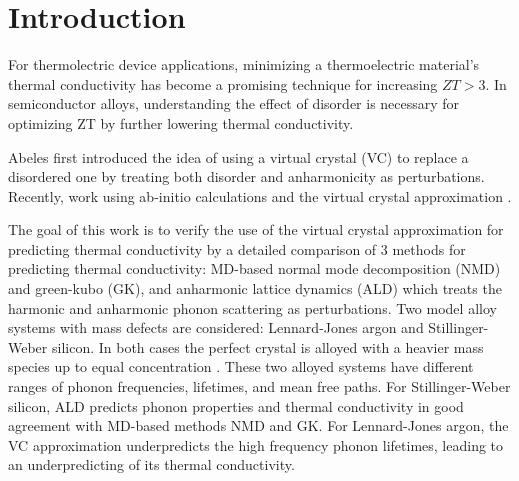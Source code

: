 \documentclass[aps,prb,twocolumn,superscriptaddress,preprintnumbers,amsmath,amssymb,floatfix]{revtex4}
\begin{document}
\maketitle
\clearpage
\section{\label{S:Intro}Introduction}

For thermolectric device applications, minimizing a thermoelectric 
material's thermal 
conductivity has become a promising technique for increasing $ZT>3$.
\cite{chen_recent_2003,dresselhaus_new_2007} In semiconductor alloys, 
understanding the effect of disorder is necessary for optimizing 
ZT by further lowering thermal conductivity.
\cite{he_thermoelectric_2006,huang_filler-reduced_2010,
toberer_phonon_2011,tian_phonon_2012}

Abeles first introduced the idea of using a virtual crystal (VC) to 
replace a disordered one by treating both
disorder and anharmonicity as perturbations.
\cite{abeles_lattice_1963} 
Recently, work using ab-initio calculations and the virtual crystal 
approximation \cite{garg_role_2011,tian_phonon_2012}.

The goal of this work is to verify the use of the virtual crystal 
approximation for predicting thermal conductivity by a detailed comparison 
of 3 methods for predicting thermal conductivity: MD-based normal mode 
decomposition (NMD) and green-kubo (GK), 
and anharmonic lattice dynamics (ALD) which treats the harmonic and 
anharmonic phonon scattering as perturbations. Two model alloy systems 
with mass defects are considered: 
Lennard-Jones argon and Stillinger-Weber silicon. 
In both cases the perfect crystal is 
alloyed with a heavier mass species up to equal concentration . These 
two alloyed systems have different ranges of phonon frequencies, 
lifetimes, and mean free paths. For Stillinger-Weber silicon, 
ALD predicts phonon properties and thermal 
conductivity in good agreement with MD-based methods NMD and GK. 
For Lennard-Jones argon, the VC approximation underpredicts 
the high frequency phonon lifetimes, leading to an underpredicting of 
its thermal conductivity. 

\end{document}
